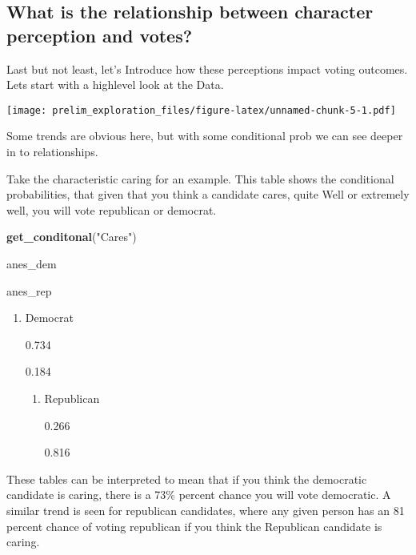 \documentclass[
]{article}
\newenvironment{Shaded}{\begin{snugshade}}{\end{snugshade}}
\newcommand{\KeywordTok}[1]{\textcolor[rgb]{0.13,0.29,0.53}{\textbf{#1}}}
\newcommand{\NormalTok}[1]{#1}
\newcommand{\StringTok}[1]{\textcolor[rgb]{0.31,0.60,0.02}{#1}}
\providecommand{\tightlist}{%
  \setlength{\itemsep}{0pt}\setlength{\parskip}{0pt}}
\begin{document}
\hypertarget{what-is-the-relationship-between-character-perception-and-votes}{%
\subsection{What is the relationship between character perception and
votes?}\label{what-is-the-relationship-between-character-perception-and-votes}}

Last but not least, let's Introduce how these perceptions impact voting
outcomes. Lets start with a highlevel look at the Data.

\texttt{[image: prelim\_exploration\_files/figure-latex/unnamed-chunk-5-1.pdf]}

Some trends are obvious here, but with some conditional prob we can see
deeper in to relationships.

Take the characteristic caring for an example. This table shows the
conditional probabilities, that given that you think a candidate cares,
quite Well or extremely well, you will vote republican or democrat.

\begin{Shaded}
\begin{Highlighting}[]
\KeywordTok{get_conditonal}\NormalTok{(}\StringTok{"Cares"}\NormalTok{)}
\end{Highlighting}
\end{Shaded}

anes\_dem

anes\_rep

\begin{enumerate}
\def\labelenumi{\arabic{enumi}.}
\tightlist
\item
  Democrat

  {0.734}

  {0.184}

  \begin{enumerate}
  \def\labelenumii{\arabic{enumii}.}
  \setcounter{enumii}{1}
  \tightlist
  \item
    Republican

    {0.266}

    {0.816}
  \end{enumerate}
\end{enumerate}

These tables can be interpreted to mean that if you think the democratic
candidate is caring, there is a 73\% percent chance you will vote
democratic. A similar trend is seen for republican candidates, where any
given person has an 81 percent chance of voting republican if you think
the Republican candidate is caring.
\end{document}
